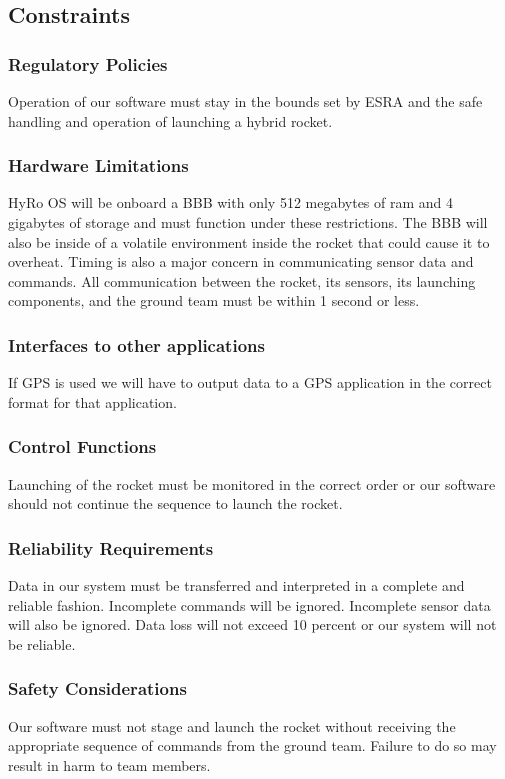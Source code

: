 \documentclass[10pt,draftclsnofoot,onecolumn,retainorgcmds]{IEEEtran}
\begin{document}
\subsection{Constraints}

\subsubsection{\bf  Regulatory Policies}Operation of our software must stay in the bounds set by ESRA and the safe handling and operation of launching a hybrid rocket.  

\subsubsection{\bf Hardware Limitations} HyRo OS will be onboard a BBB with only 512 megabytes of ram and 4 gigabytes of storage and must function under these restrictions. The BBB will also be inside of a volatile environment inside the rocket that could cause it to overheat. Timing is also a major concern in communicating sensor data and commands. All communication between the rocket, its sensors, its launching components, and the ground team must be within 1  second or less.

\subsubsection{\bf  Interfaces to other applications} If GPS is used we will have to output data to a GPS application in the correct format for that application.
\subsubsection{\bf Control Functions} Launching of the rocket must be monitored in the correct order or our software should not continue the sequence to launch the rocket.
\subsubsection{\bf Reliability Requirements} Data in our system must be transferred and interpreted in a complete and reliable fashion. Incomplete commands will be ignored. Incomplete sensor data will also be ignored. Data loss will not exceed 10 percent or our system will not be reliable.
\subsubsection{\bf Safety Considerations} Our software must not stage and launch the rocket without receiving the appropriate sequence of commands from the ground team. Failure to do so may result in harm to team members.
\end{document}
